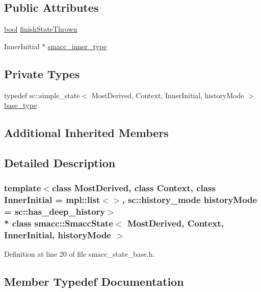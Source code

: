 \subsection*{Public Attributes}
\begin{DoxyCompactItemize}
\item 
\hyperlink{classbool}{bool} \hyperlink{classsmacc_1_1SmaccState_a6c40f733c35ddfb9ae2a2f8e9bab07d3}{finish\+State\+Thrown}
\item 
Inner\+Initial $\ast$ \hyperlink{classsmacc_1_1SmaccState_a087d0f66729b98614feb8c59ea548af1}{smacc\+\_\+inner\+\_\+type}
\end{DoxyCompactItemize}
\subsection*{Private Types}
\begin{DoxyCompactItemize}
\item 
typedef sc\+::simple\+\_\+state$<$ Most\+Derived, Context, Inner\+Initial, history\+Mode $>$ \hyperlink{classsmacc_1_1SmaccState_a68f547c6fe147554bbe607b6fcd8e40a}{base\+\_\+type}
\end{DoxyCompactItemize}
\subsection*{Additional Inherited Members}


\subsection{Detailed Description}
\subsubsection*{template$<$class Most\+Derived, class Context, class Inner\+Initial = mpl\+::list$<$$>$, sc\+::history\+\_\+mode history\+Mode = sc\+::has\+\_\+deep\+\_\+history$>$\\*
class smacc\+::\+Smacc\+State$<$ Most\+Derived, Context, Inner\+Initial, history\+Mode $>$}



Definition at line 20 of file smacc\+\_\+state\+\_\+base.\+h.



\subsection{Member Typedef Documentation}
